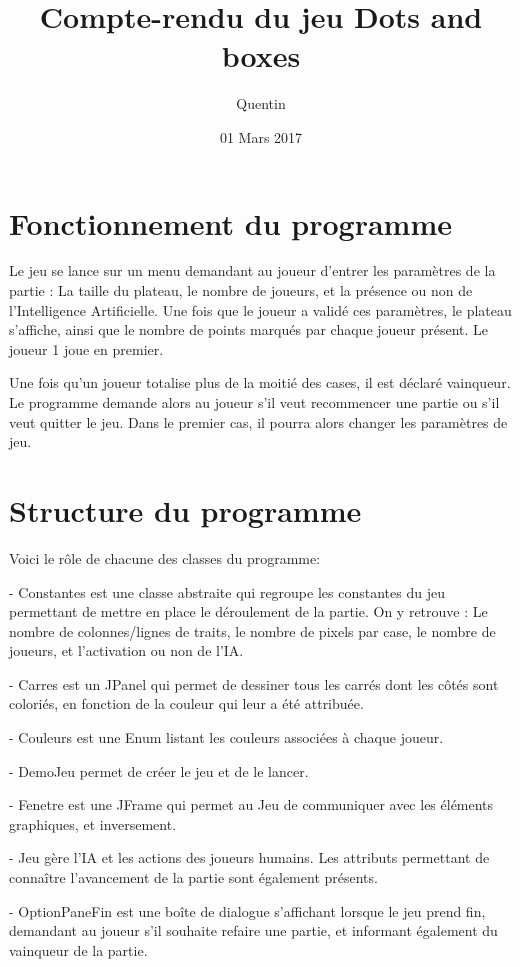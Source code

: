\documentclass{report}
\title{Compte-rendu du jeu Dots and boxes}
\author{Quentin \bsc{SAUVAGE}}
\date{01 Mars 2017}
\begin{document}
\maketitle
\chapter{Fonctionnement du programme}
Le jeu se lance sur un menu demandant au joueur d'entrer les paramètres de la partie : La taille du plateau, le nombre de joueurs, et la présence ou non de l'Intelligence Artificielle.
Une fois que le joueur a validé ces paramètres, le plateau s'affiche, ainsi que le nombre de points marqués par chaque joueur présent. Le joueur 1 joue en premier. 

Une fois qu'un joueur totalise plus de la moitié des cases, il est déclaré vainqueur. Le programme demande alors au joueur s'il veut recommencer une partie ou s'il veut quitter le jeu. Dans le premier cas, il pourra alors changer les paramètres de jeu.

\chapter{Structure du programme}

Voici le rôle de chacune des classes du programme:

- Constantes est une classe abstraite qui regroupe les constantes du jeu permettant de mettre en place le déroulement de la partie. On y retrouve : Le nombre de colonnes/lignes de traits, le nombre de pixels par case, le nombre de joueurs, et l'activation ou non de l'IA.

- Carres est un JPanel qui permet de dessiner tous les carrés dont les côtés sont coloriés, en fonction de la couleur qui leur a été attribuée.

- Couleurs est une Enum listant les couleurs associées à chaque joueur.

- DemoJeu permet de créer le jeu et de le lancer.

- Fenetre est une JFrame qui permet au Jeu de communiquer avec les éléments graphiques, et inversement.

- Jeu gère l'IA et les actions des joueurs humains. Les attributs permettant de connaître l'avancement de la partie sont également présents.

- OptionPaneFin est une boîte de dialogue s'affichant lorsque le jeu prend fin, demandant au joueur s'il souhaite refaire une partie, et informant également du vainqueur de la partie.
\end{document}
